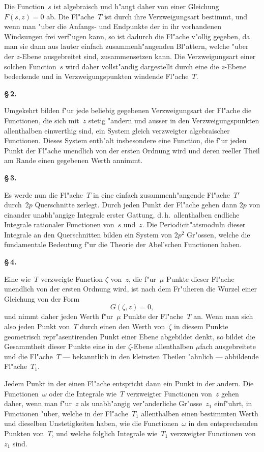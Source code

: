 \documentclass[12pt,a4paper]{book}
\theoremstyle{definition}
\theoremstyle{remark}
\begin{document}
Die Function~$s$ ist algebraisch und h"angt daher von einer Gleichung
$F(s,z) = 0$ ab. Die Fl"ache~$T$ ist durch ihre Verzweigungsart bestimmt,
und wenn man "uber die Anfangs- und Endpunkte der in ihr vorhandenen
Windsungen frei verf"ugen kann, so ist dadurch die Fl"ache v"ollig
gegeben, da man sie dann aus lauter einfach zusammenh"angenden
Bl"attern, welche "uber der $z$-Ebene ausgebreitet sind, zusammensetzen
kann. Die Verzweigungsart einer solchen Function~$s$ wird daher
vollst"andig dargestellt durch eine die $z$-Ebene bedeckende und in
Verzweigungspunkten windende Fl"ache~$T$.

\medskip
\textbf{\S\,2.}

Umgekehrt bilden f"ur jede beliebig gegebenen Verzweigungsart der
Fl"ache die Functionen, die sich mit~$z$ stetig "andern und ausser in den
Verzweigungspunkten allenthalben einwerthig sind, ein System gleich
verzweigter algebraischer Functionen. Dieses System enth"alt insbesondere
eine Function, die f"ur jeden Punkt der Fl"ache unendlich von der ersten
Ordnung wird und deren reeller Theil am Rande einen gegebenen Werth
annimmt.

\medskip
\textbf{\S\,3.}

Es werde nun die Fl"ache~$T$ in eine einfach zusammenh"angende
Fl"ache~$T'$ durch~$2p$ Querschnitte zerlegt. Durch jeden Punkt der
Fl"ache gehen dann $2p$ von einander unabh"angige Integrale erster
Gattung, d.\,h.\ allenthalben endliche Integrale rationaler Functionen
von~$s$ und~$z$. Die Periodicit"atsmoduln dieser Integrale an den
Querschnitten bilden ein System von $2p^2$ Gr"ossen, welche die fundamentale
Bedeutung f"ur die Theorie der Abel'schen Functionen haben.

\medskip
\textbf{\S\,4.}

Eine wie~$T$ verzweigte Function $\zeta$ von~$z$, die f"ur~$\mu$ Punkte dieser
Fl"ache unendlich von der ersten Ordnung wird, ist nach dem Fr"uheren
die Wurzel einer Gleichung von der Form
\[
G(\zeta, z) = 0,
\]
und nimmt daher jeden Werth f"ur~$\mu$ Punkte der Fl"ache~$T$ an.
Wenn man sich also jeden Punkt von~$T$ durch einen den Werth
von~$\zeta$ in diesem Punkte geometrisch repr"asentirenden Punkt einer
Ebene abgebildet denkt, so bildet die Gesammtheit dieser Punkte eine
in der $\zeta$-Ebene allenthalben $\mu$fach ausgebreitete und die Fl"ache~$T$
--- bekanntlich in den kleinsten Theilen "ahnlich --- abbildende
Fl"ache~$T_1$.

Jedem Punkt in der einen Fl"ache entspricht dann ein Punkt in der
andern. Die Functionen~$\omega$ oder die Integrale wie~$T$ verzweigter
Functionen von~$z$ gehen daher, wenn man f"ur~$z$ als unabh"angig
ver"anderliche Gr"osse~$z_1$ einf"uhrt, in Functionen "uber, welche in der
Fl"ache~$T_1$ allenthalben einen bestimmten Werth und dieselben
Unstetigkeiten haben, wie die Functionen~$\omega$ in den entsprechenden
Punkten von~$T$, und welche folglich Integrale wie~$T_1$ verzweigter
Functionen von~$z_1$ sind.
\end{document}
